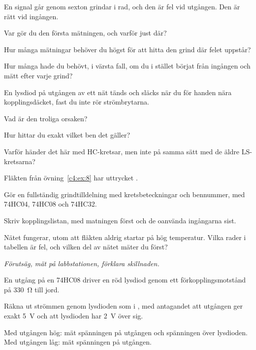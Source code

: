\label{c5:ex:7}
En signal går genom sexton grindar i rad, och den är fel vid utgången. Den är rätt vid ingången.
\begin{parts}
  \item Var gör du den första mätningen, och varför just där?
  \item Hur många mätningar behöver du högst för att hitta den grind där felet uppstår?
  \item Hur många hade du behövt, i värsta fall, om du i stället börjat från ingången och mätt efter
    varje grind?
\end{parts}

\label{c5:ex:8}
En lysdiod på utgången av ett nät tänds och släcks när du för handen nära kopplingsdäcket, fast du
inte rör strömbrytarna.
\begin{parts}
  \item Vad är den troliga orsaken?
  \item Hur hittar du exakt vilket ben det gäller?
  \item Varför händer det här med HC-kretsar, men inte på samma sätt med de äldre LS-kretsarna?
\end{parts}

\label{c5:ex:9}
Fläkten från övning~\ref{c4:ex:8} har uttrycket .
\begin{parts}
  \item Gör en fullständig grindtilldelning med kretsbeteckningar och bennummer, med 74HC04,
    74HC08 och 74HC32.
  \item Skriv kopplingslistan, med matningen först och de oanvända ingångarna sist.
  \item Nätet fungerar, utom att fläkten aldrig startar på hög temperatur. Vilka rader i tabellen
    är fel, och vilken del av nätet mäter du först?
\end{parts}

\label{c5:ex:10}
\emph{Förutsäg, mät på labbstationen, förklara skillnaden.}

En utgång på en 74HC08 driver en röd lysdiod genom ett förkopplingsmotstånd på 330~Ω till jord.

Räkna ut strömmen genom lysdioden som i , med antagandet att utgången ger exakt 5~V
och att lysdioden har 2~V över sig.

Med utgången hög: mät spänningen på utgången och spänningen över lysdioden. Med utgången låg: mät
spänningen på utgången.


